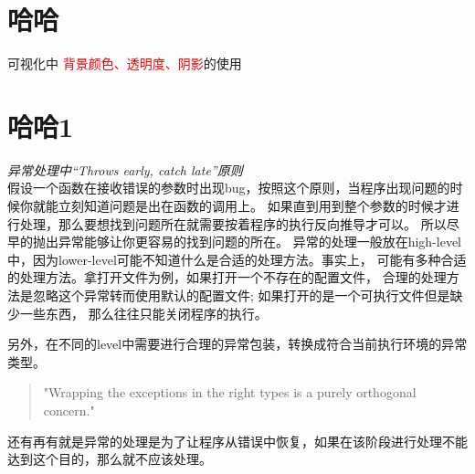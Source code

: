 \documentclass{article}
\begin{document}
\section{哈哈}
可视化中 
\textcolor{red}{背景颜色、透明度、阴影}的使用
\section{哈哈1}
\emph{异常处理中“Throws early, catch late”原则} \\
\cite{exceptionhandling}
假设一个函数在接收错误的参数时出现bug，按照这个原则，当程序出现问题的时候你就能立刻知道问题是出在函数的调用上。
如果直到用到整个参数的时候才进行处理，那么要想找到问题所在就需要按着程序的执行反向推导才可以。
所以尽早的抛出异常能够让你更容易的找到问题的所在。
异常的处理一般放在high-level中，因为lower-level可能不知道什么是合适的处理方法。事实上，
可能有多种合适的处理方法。拿打开文件为例，如果打开一个不存在的配置文件，
合理的处理方法是忽略这个异常转而使用默认的配置文件; 如果打开的是一个可执行文件但是缺少一些东西，
那么往往只能关闭程序的执行。

另外，在不同的level中需要进行合理的异常包装，转换成符合当前执行环境的异常类型。
\begin{quotation}
  "Wrapping the exceptions in the right types is a purely orthogonal
  concern."
\end{quotation}
还有再有就是异常的处理是为了让程序从错误中恢复，如果在该阶段进行处理不能达到这个目的，那么就不应该处理。



\end{document}
